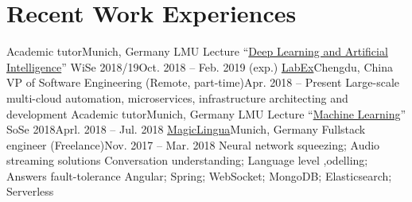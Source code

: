 \section{\textbf{Recent Work Experiences}}
  \resumeSubHeadingListStart
    \resumeSubheading
      {Academic tutor}{Munich, Germany}
      {LMU Lecture ``\href{http://www.dbs.ifi.lmu.de/cms/studium_lehre/lehre_master/deep1819/index.html}{Deep Learning and Artificial Intelligence}'' WiSe 2018/19}{Oct. 2018 -- Feb. 2019 (exp.)}
      \resumeItemListStart
      \resumeItemListEnd
    \resumeSubheading
      {\href{https://labex.io/}{LabEx}}{Chengdu, China}
      {VP of Software Engineering (Remote, part-time)}{Apr. 2018 -- Present}
      \resumeItemListStart
          {Large-scale multi-cloud automation, microservices, infrastructure architecting and development}
      \resumeItemListEnd
    \resumeSubheading
      {Academic tutor}{Munich, Germany}
      {LMU Lecture ``\href{http://www.dbs.ifi.lmu.de/cms/studium_lehre/lehre_master/ml18/index.html}{Machine Learning}'' SoSe 2018}{Aprl. 2018 -- Jul. 2018}
      \resumeItemListStart
      \resumeItemListEnd
    \resumeSubheading
    {\href{https://magiclingua.com/}{MagicLingua}}{Munich, Germany}
    {Fullstack engineer (Freelance)}{Nov. 2017 -- Mar. 2018}
    \resumeItemListStart
        {Neural network squeezing; Audio streaming solutions}
        {Conversation understanding; Language level ,odelling; Answers fault-tolerance}
        {Angular; Spring; WebSocket; MongoDB; Elasticsearch; Serverless}
    \resumeItemListEnd
  \resumeSubHeadingListEnd